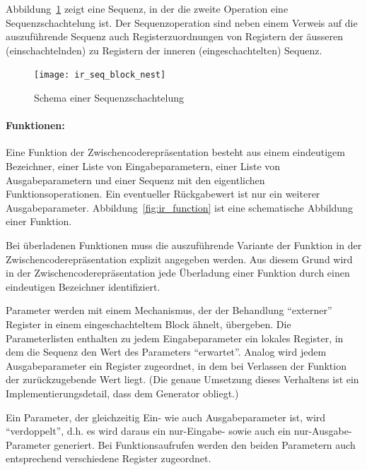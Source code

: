\documentclass[twoside,a4paper,fleqn,12pt]{book}
\begin{document}
Abbildung~\ref{fig:ir_seq_block_nest} zeigt eine Sequenz, in der die zweite Operation eine Sequenzschachtelung ist.
Der Sequenzoperation sind neben einem Verweis auf die auszuführende Sequenz auch Registerzuordnungen von
Registern der äusseren (einschachtelnden) zu Registern der inneren (eingeschachtelten) Sequenz.

\begin{figure}[h]
   \centering
  \texttt{[image: ir\_seq\_block\_nest]}
  \caption{Schema einer Sequenzschachtelung}
  \label{fig:ir_seq_block_nest}
\end{figure}

\paragraph{Funktionen:}
Eine Funktion der Zwischencoderepräsentation besteht aus einem eindeutigem Bezeichner, einer Liste von Eingabeparametern,
einer Liste von Ausgabeparametern und einer Sequenz mit den eigentlichen Funktionsoperationen.
Ein eventueller Rückgabewert ist nur ein weiterer Ausgabeparameter.
Abbildung~\ref{fig:ir_function} ist eine schematische Abbildung einer Funktion.

Bei überladenen Funktionen muss die auszuführende Variante der Funktion in der Zwischencoderepräsentation
explizit angegeben werden.
Aus diesem Grund wird in der Zwischencoderepräsentation jede Überladung einer Funktion durch einen eindeutigen Bezeichner identifiziert.

Parameter werden mit einem Mechanismus, der der Behandlung "`externer"' Register in einem eingeschachteltem
Block ähnelt, übergeben. Die Parameterlisten enthalten zu jedem Eingabeparameter ein lokales Register, in dem die
Sequenz den Wert des Parameters "`erwartet"'. Analog wird jedem Ausgabeparameter ein Register zugeordnet,
in dem bei Verlassen der Funktion der zurückzugebende Wert liegt.
(Die genaue Umsetzung dieses Verhaltens ist ein Implementierungsdetail, dass dem Generator obliegt.)

Ein Parameter, der gleichzeitig Ein- wie auch Ausgabeparameter ist, wird "`verdoppelt"', d.h. es wird daraus
ein nur-Eingabe- sowie auch ein nur-Ausgabe-Parameter generiert. Bei Funktionsaufrufen werden den beiden
Parametern auch entsprechend verschiedene Register zugeordnet.
\end{document}
